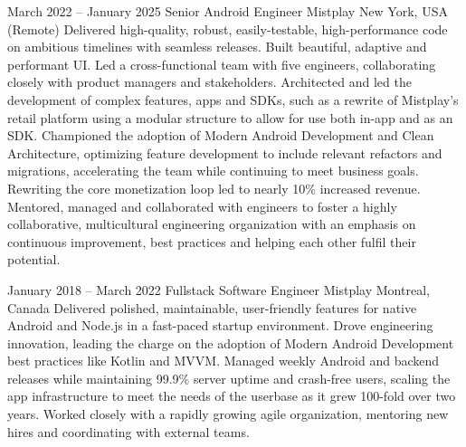 \documentclass[10pt,a4paper,sans]{moderncv} %
\newcommand{\vs}[0]{\smallskip}
\begin{document}
\cventry
{March 2022 -- January 2025}
{Senior Android Engineer}
{{Mistplay}}
{New York, USA (Remote)}
{}{
	Delivered high-quality, robust, easily-testable, high-performance code on ambitious timelines with seamless releases. Built beautiful, adaptive and performant UI.\newline{}\newline{}
	Led a cross-functional team with five engineers, collaborating closely with product managers and stakeholders.\newline{}\newline{}
	Architected and led the development of complex features, apps and SDKs, such as a rewrite of Mistplay’s retail platform using a modular structure to allow for use both in-app and as an SDK.\newline{}\newline{}
	Championed the adoption of Modern Android Development and Clean Architecture, optimizing feature development to include relevant refactors and migrations, accelerating the team while continuing to meet business goals. Rewriting the core monetization loop led to nearly 10\% increased revenue.\newline{}\newline{}
	Mentored, managed and collaborated with engineers to foster a highly collaborative, multicultural engineering organization with an emphasis on continuous improvement, best practices and helping each other fulfil their potential.\newline{}\newline{}
}\vs

\cventry
{January 2018 -- March 2022}
{Fullstack Software Engineer}
{{Mistplay}}
{Montreal, Canada}
{}
{
	Delivered polished, maintainable, user-friendly features for native Android and Node.js in a fast-paced startup environment.\newline{}\newline{}
	Drove engineering innovation, leading the charge on the adoption of Modern Android Development best practices like Kotlin and MVVM.\newline{}\newline{}
	Managed weekly Android and backend releases while maintaining 99.9\% server uptime and crash-free users, scaling the app infrastructure to meet the needs of the userbase as it grew 100-fold over two years.\newline{}\newline{}
	Worked closely with a rapidly growing agile organization, mentoring new hires and coordinating with external teams.\newline{}\newline{}
}\vs
\end{document}

